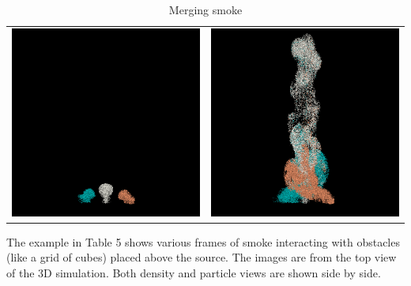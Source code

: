 \documentclass[a4paper,11pt]{article}
\theoremstyle{mytheor}
\begin{document}
\begin{table}[H]
\caption{Merging smoke}
\centering
\begin{tabular}{cc}
\includegraphics[width=70mm]{interacting_1.png} &\includegraphics[width=70mm]{interacting_2.png}\\
\end{tabular}
\end{table}



\par
\noindent
The example in Table 5 shows various frames of smoke interacting with obstacles (like a grid of cubes) placed above the source. The images are from the top view of the 3D simulation. Both density and particle views are shown side by side.
\end{document}
